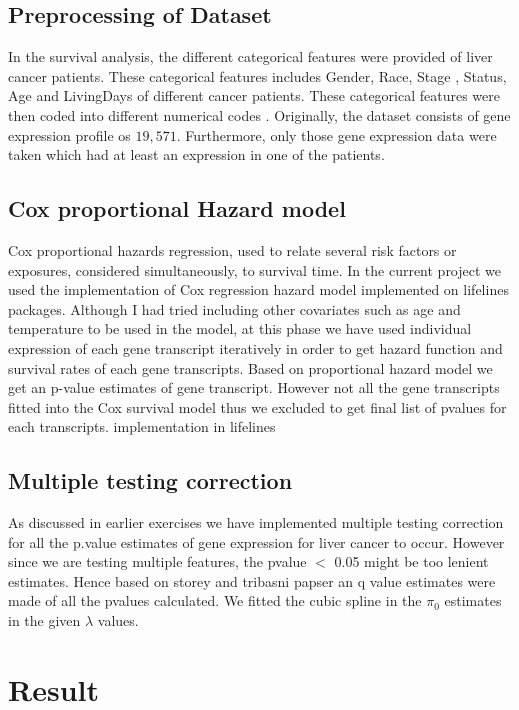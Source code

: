 \documentclass[11pt]{article}
\begin{document}
	\subsection {Preprocessing of Dataset}
In the survival analysis, the different categorical features were provided of liver cancer patients. These categorical features includes Gender, Race, Stage , Status, Age and LivingDays of different cancer patients.  These categorical features were then coded into different numerical codes . Originally, the dataset consists of gene expression profile os $19,571$. Furthermore, only those gene expression data were taken which had at least an expression in one of the patients.  

	\subsection{Cox proportional Hazard model}
	 Cox proportional hazards regression, used to relate several risk factors or exposures, considered simultaneously, to survival time. In the current project we used the implementation of Cox regression hazard model implemented on lifelines packages. Although I had tried including other covariates such as age and temperature to be used in the model, at this phase we have used individual expression of each gene transcript iteratively in order to get hazard function and survival rates of each gene transcripts. Based on proportional hazard model we get an p-value estimates of gene transcript. However not all the gene transcripts fitted into the Cox survival model thus we excluded to get final list of pvalues for each transcripts. implementation in lifelines \cite{lifelines} 
	 
	\subsection {Multiple testing correction}
	As discussed in earlier exercises we have  implemented multiple testing correction for all the p.value estimates of gene expression for liver cancer to occur. However since we are testing multiple features, the pvalue $<$ 0.05 might be too lenient estimates. Hence based on storey and tribasni papser \cite {} an q value estimates were made of all the pvalues calculated. We fitted the cubic spline in the $\pi_0$ estimates in the given  $\lambda$ values.
	 


 \section{Result}
 
\end{document}
